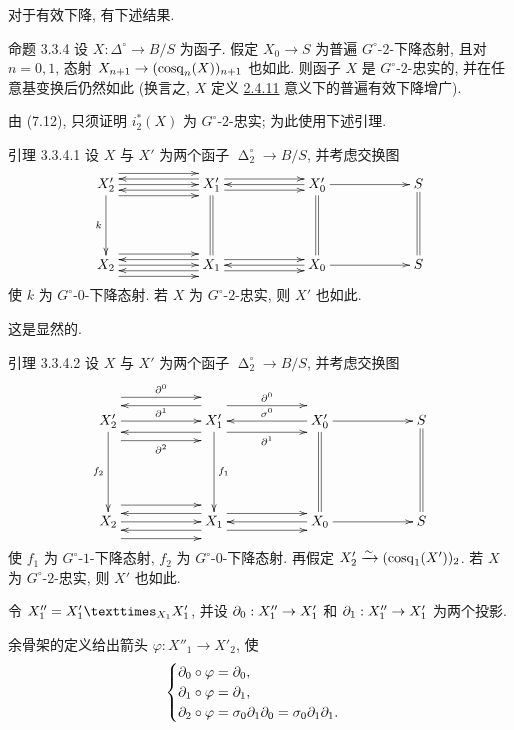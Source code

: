 对于有效下降, 有下述结果.

\begin{enonce*}{命题 3.3.4}
设 $X:\Delta^{\circ}\to B/S$ 为函子.
假定 $X_0\to S$ 为普遍 $G^{\circ}$-$2$-下降态射,
且对 $n=0,1$, 态射 $X_{n+1}\to(\cosk_n(X))_{n+1}$ 也如此.
则函子 $X$ 是 $G^{\circ}$-$2$-忠实的, 并在任意基变换后仍然如此
(换言之, $X$ 定义 \hyperref[Vbis.def2.4.11]{2.4.11} 意义下的普遍有效下降增广).
\end{enonce*}

由 \cite{sga4.exp.Vbis.bib.4} (7.12), 只须证明 $i_2^{\ast}(X)$ 为 $G^{\circ}$-$2$-忠实;
为此使用下述引理.

\begin{enonce*}{引理 3.3.4.1}
设\pageoriginale{} $X$ 与 $X'$ 为两个函子 $\mathop{\Delta}_2^{\circ}\to B/S$,
并考虑交换图
\[
\xymatrix@R=1.5cm@C=2cm{
X'_2 \ar[r]\ar@<8pt>[r]\ar@<-8pt>[r]\ar[d]_{k}&X'_1\ar@<4pt>[l]
\ar@<-4pt>[l]\ar@<4pt>[r]\ar@<-4pt>[r]\ar@{=}[d]&X'_0\ar[l]
\ar[r]\ar@{=}[d]&S\ar@{=}[d]\\
X_2 \ar[r]\ar@<8pt>[r]\ar@<-8pt>[r]&X_1\ar@<4pt>[l]
\ar@<-4pt>[l]\ar@<4pt>[r]\ar@<-4pt>[r]&X_0\ar[l]\ar[r]&S
}
\]
使 $k$ 为 $G^{\circ}$-$0$-下降态射.
若 $X$ 为 $G^{\circ}$-$2$-忠实, 则 $X'$ 也如此.
\end{enonce*}

这是显然的.

\begin{enonce*}{引理 3.3.4.2}
设 $X$ 与 $X'$ 为两个函子 $\mathop{\Delta}_2^{\circ}\to B/S$,
并考虑交换图
\def\labelstyle{\scriptstyle}
\[
\xymatrix@R=2cm@C=2cm{
X'_2 \ar[r]^{\partial^{1}} \ar@<17pt>[r]^{\partial^{0}}
\ar@<-14pt>[r]_{\partial^{2}} \ar[d]_{f_2}&X'_1\ar@<8pt>[l]
\ar@<-11pt>[l]\ar@<11pt>[r]^{\partial^{0}}\ar@<-8pt>[r]_{\partial^{1}}
\ar[d]^{f_1}&X'_0\ar[l]_{\sigma^{0}}\ar[r]\ar@{=}[d]&S\ar@{=}[d]\\
X_2 \ar[r]\ar@<12pt>[r]\ar@<-12pt>[r]&X_1\ar@<6pt>[l]
\ar@<-6pt>[l]\ar@<6pt>[r]\ar@<-6pt>[r]&X_0\ar[l]\ar[r]&S
}
\]
使 $f_1$ 为 $G^{\circ}$-$1$-下降态射, $f_2$ 为 $G^{\circ}$-$0$-下降态射.
再假定 $X'_2\xrightarrow{\sim}(\operatorname{cosq}_1(X'))_2$.
若 $X$ 为 $G^{\circ}$-$2$-忠实, 则 $X'$ 也如此.
\end{enonce*}

令 $X''_1=\fprod{X'_1}{X'_1}{X_1}$,
并设 $\Ysheaf{\partial}_0:X''_1\to X'_1$ 和
$\Ysheaf{\partial}_1:X''_1\to X'_1$ 为两个投影.

余骨架的定义给出箭头 $\varphi:X''_1\to X'_2$, 使
\begin{equation*}
\begin{cases}
\partial_0\circ\varphi=\Ysheaf{\partial}_0,\\
\partial_1\circ\varphi=\Ysheaf{\partial}_1,\\
\partial_2\circ\varphi=\sigma_0\partial_1\Ysheaf{\partial}_0
=\sigma_0\partial_1\Ysheaf{\partial}_1{\quoi}.
\end{cases}
\end{equation*}

